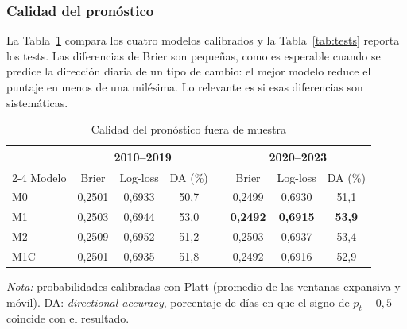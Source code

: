 \documentclass[11pt,a4paper]{article}
\begin{document}
\subsubsection{Calidad del pronóstico}
La Tabla~\ref{tab:pronostico} compara los cuatro modelos calibrados y la Tabla~\ref{tab:tests} reporta los tests. Las diferencias de Brier son pequeñas, como es esperable cuando se predice la dirección diaria de un tipo de cambio: el mejor modelo reduce el puntaje en menos de una milésima. Lo relevante es si esas diferencias son sistemáticas.

\begin{table}[htbp]\centering
\caption{Calidad del pronóstico fuera de muestra}\label{tab:pronostico}
\begin{threeparttable}
\begin{tabular}{l ccc c ccc}
\toprule
 & \multicolumn{3}{c}{2010--2019} & & \multicolumn{3}{c}{2020--2023} \\
\cmidrule{2-4}\cmidrule{6-8}
Modelo & Brier & Log-loss & DA (\%) & & Brier & Log-loss & DA (\%) \\
\midrule
M0 & 0,2501 & 0,6933 & 50,7 & & 0,2499 & 0,6930 & 51,1 \\
M1 & 0,2503 & 0,6944 & 53,0 & & \textbf{0,2492} & \textbf{0,6915} & \textbf{53,9} \\
M2 & 0,2509 & 0,6952 & 51,2 & & 0,2503 & 0,6937 & 53,4 \\
M1C & 0,2501 & 0,6935 & 51,8 & & 0,2492 & 0,6916 & 52,9 \\
\bottomrule
\end{tabular}
\begin{tablenotes}\footnotesize
\item \emph{Nota:} probabilidades calibradas con Platt (promedio de las ventanas expansiva y móvil). DA: \emph{directional accuracy}, porcentaje de días en que el signo de \(p_t-0{,}5\) coincide con el resultado.
\end{tablenotes}
\end{threeparttable}
\end{table}
\end{document}
